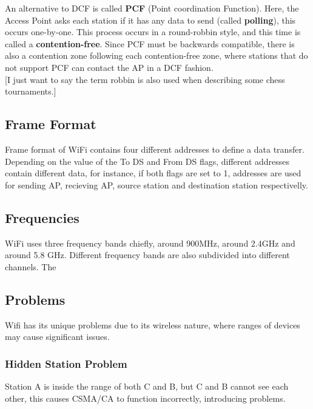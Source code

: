 \documentclass[11pt,a4paper,twoside]{book}
\begin{document}
An alternative to DCF is called \textbf{PCF} (Point coordination Function). Here, the Access Point asks each station if it has any data to send (called \textbf{polling}), this occurs one-by-one. This process occurs in a round-robbin style, and this time is called a \textbf{contention-free}. Since PCF must be backwards compatible, there is also a contention zone following each contention-free zone, where stations that do not support PCF can contact the AP in a DCF fashion.\\

[I just want to say the term robbin is also used when describing some chess tournaments.]\\

\subsection{Frame Format}

Frame format of WiFi contains four different addresses to define a data transfer. Depending on the value of the To DS and From DS flags, different addresses contain different data, for instance, if both flags are set to 1, addresses are used for sending AP, recieving AP, source station and destination station respectivelly.\\

\subsection{Frequencies}

WiFi uses three frequency bands chiefly, around 900MHz, around 2.4GHz and around 5.8 GHz. Different frequency bands are also subdivided into different channels. The

\subsection{Problems}
Wifi has its unique problems due to its wireless nature, where ranges of devices may cause significant issues.

\subsubsection{Hidden Station Problem}

Station A is inside the range of both C and B, but C and B cannot see each other, this causes CSMA/CA to function incorrectly, introducing problems.\\
\end{document}
